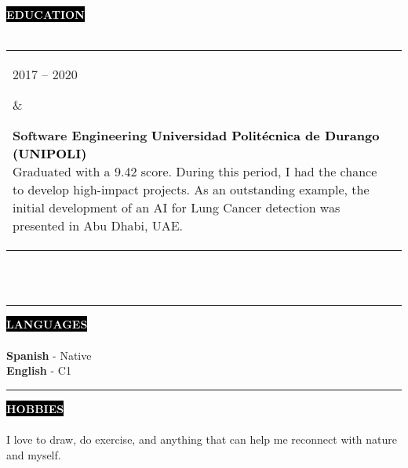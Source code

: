\documentclass[10pt,A4]{article}
\makeatletter
\newcounter{a}
\newcounter{b}
\newcounter{c}
\newcommand{\cvsection}[1] {
	\textcolor{white}{\MakeUppercase{\textbf{#1}}}
}
\newcommand{\cvsect}[1]{
	\colorbox{black}{{\cvsection{#1}}}\\\\%
}
\newenvironment{entrylist}{%
	\begin{tabular*}{\textwidth}[t]{@{\extracolsep{\fill}}ll}
	}{%
	\end{tabular*}
}
\newcommand{\entry}[4]{%
	\parbox[t]{3.5cm}{%
		#1%
	}%
	&\parbox[t]{14cm}{%
		\textbf{#2}%
		\hfill%
		{\footnotesize \textbf{\textcolor{black}{#3}}}\\%
		#4%
	}\\\\}
\makeatother
\begin{document}

	\cvsect{Education}
	\begin{entrylist}
		\entry
		{2017 – 2020}
		{Software Engineering}
		{Universidad Politécnica de Durango (UNIPOLI)}
		{Graduated with a 9.42 score. During this period, I had the chance
        to develop high-impact projects. As an outstanding example, the initial
        development of an AI for Lung Cancer detection was presented
        in Abu Dhabi, UAE.}
	\end{entrylist}
	\\\\
	\begin{minipage}[t]{0.3\textwidth}\hrule height 0pt width 0pt%
		\cvsect{Languages}
		\textbf{Spanish} - Native\\
		\textbf{English} - C1\\
	\end{minipage}%
	\hspace{0cm}
	\begin{minipage}[t]{0.4\textwidth}\hrule height 0pt width 0pt%
		\cvsect{Hobbies}
		I love to draw, do exercise, and anything that can help me
		reconnect with nature and myself.
	\end{minipage}%
	
\end{document}
